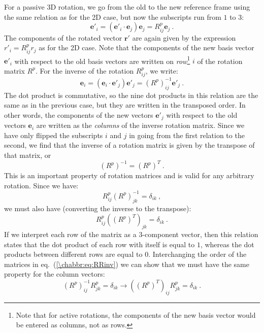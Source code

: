 For a passive 3D rotation, we go from the old to the new reference frame using the same relation as for the 2D case, but now the subscripts run from $1$ to $3$:
\[
	\mathbf{e}'_i = (\mathbf{e}'_i\cdot\mathbf{e}_j)\mathbf{e}_j = R^p_{ij}\mathbf{e}_j\ .
\]
The components of the rotated vector $\mathbf{r}'$ are again given by the expression $r'_i = R^p_{ij}r_j$ as for the 2D case.  Note that the components of the new basis vector $\mathbf{e}'_i$ with respect to the old basis vectors are written on \textit{row}\footnote{Note that for active rotations, the components of the new basis vector would be entered as columns, not as rows.} $i$ of the rotation matrix $R^p$. For the inverse of the rotation $R^p_{ij}$, we write:
\[
	\mathbf{e}_i = (\mathbf{e}_i\cdot\mathbf{e}'_j)\mathbf{e}'_j = (R^p)^{-1}_{ij}\mathbf{e}'_j\ .
\]
The dot product is commutative, so the nine dot products in this relation are the same as in the previous case, but they are written in the transposed order.  In other words, the components of the new vectors $\mathbf{e}'_j$ with respect to the old vectors $\mathbf{e}_i$ are written as the \textit{columns} of the inverse rotation matrix.  Since we have only flipped the subscripts $i$ and $j$ in going from the first relation to the second, we find that the inverse of a rotation matrix is given by the transpose of that matrix, or
\[
	(R^p)^{-1} = (R^p)^T\ .
\]
This is an important property of rotation matrices and is valid for any arbitrary rotation.  Since we have:
\begin{equation}
	R^p_{ij} (R^p)^{-1}_{jk} = \delta_{ik}\ ,\label{\chabbr:eq:RRinv}
\end{equation}
we must also have (converting the inverse to the transpose):
\begin{equation}
	R^p_{ij} \left((R^p)^T\right)_{jk} = \delta_{ik}\ .
\end{equation}
If we interpret each row of the matrix as a $3$-component vector, then this relation states that the dot product of each row with itself is equal to $1$, whereas the dot products between different rows are equal to $0$.  Interchanging the order of the matrices in eq.~(\ref{\chabbr:eq:RRinv}) we can show that we must have the same property for the column vectors:
\begin{equation}
	(R^p)^{-1}_{ij}R^p_{jk} = \delta_{ik} \rightarrow \left((R^p)^T\right)_{ij} R^p_{jk} = \delta_{ik}\ .
\end{equation}
